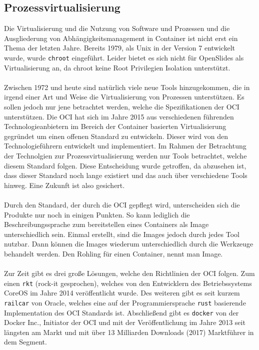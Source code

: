\documentclass[a4paper]{article}
\begin{document}
\subsection{Prozessvirtualisierung} \label{subsec:sdtpv}
Die Virtualisierung und die Nutzung von Software und Prozessen und die 
Ausgliederung von Abhängigkeitsmanagement in Container ist nicht erst ein Thema 
der letzten Jahre. Bereits 1979, als Unix in der Version 7 entwickelt wurde, 
wurde \texttt{chroot} eingeführt. Leider bietet es sich nicht für OpenSlides 
als Virtualisierung an, da chroot keine Root Privilegien Isolation 
unterstützt.\cite{containerhist}\\
\\
Zwischen 1972 und heute sind natürlich viele neue Tools hinzugekommen, die in 
irgend einer Art und Weise die Virtualisierung von Prozessen unterstützen. Es 
sollen jedoch nur jene betrachtet werden, welche die Spezifikationen der 
\acf{OCI}\cite{oci} unterstützen. Die \ac{OCI} hat sich im Jahre 2015 aus 
verschiedenen führenden Technologieanbietern im Bereich der Container basierten 
Virtualisierung gegründet um einen offenen Standard zu entwickeln. Dieser 
wird von den Technologieführern\cite{ocimembers} entwickelt und implementiert.
Im Rahmen der Betrachtung der Technolgien zur 
Prozessvirtualisierung werden nur Tools betrachtet, welche diesem Standard 
folgen. Diese Entscheidung wurde getroffen, da abzusehen ist, dass dieser 
Standard noch lange existiert und das auch über verschiedene Tools hinweg. Eine 
Zukunft ist also gesichert.\\
\\
Durch den Standard, der durch die \ac{OCI} gepflegt wird, unterscheiden sich 
die Produkte nur noch in einigen Punkten. So kann lediglich die 
Beschreibungssprache zum bereitstellen eines Containers als Image 
unterschiedlich sein.  Einmal erstellt, sind die Images jedoch durch jedes Tool 
nutzbar. Dann können die Images wiederum unterschiedlich durch die Werkzeuge 
behandelt werden. Den \glqq{}Rohling\grqq{} für einen Container, nennt man 
Image.\\
\\
Zur Zeit gibt es drei große Lösungen, welche den Richtlinien der \ac{OCI} 
folgen. Zum einen \texttt{rkt} (rock-it gesprochen), welches von den 
Entwicklern des Betriebssystems \grqq{}CoreOS\glqq{} im Jahre 2014 
veröffentlicht wurde\cite{rkthp}. Des weiteren gibt es seit kurzem 
\texttt{railcar} von \grqq{}Oracle\glqq{}, welches eine auf der 
Programmiersprache \texttt{rust} basierende Implementation des \ac{OCI} 
Standards ist\cite{railcarhp}. Abschließend gibt es \texttt{docker} von der 
\glqq{}Docker Inc.\grqq{}, Initiator der \ac{OCI} und mit der Veröffentlichung 
im Jahre 2013 seit längsten am Markt und mit über 13 Milliarden Downloads 
(2017) Marktführer in dem Segment\cite{dockerdl}.
\newpage
\end{document}
